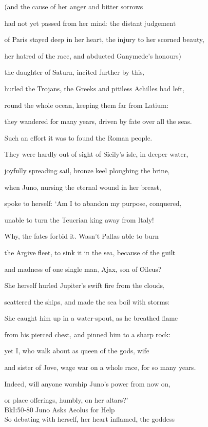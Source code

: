 \documentclass[12pt, a5paper, titlepage]{letter}
\begin{document}
(and the cause of her anger and bitter sorrows

had not yet passed from her mind: the distant judgement

of Paris stayed deep in her heart, the injury to her scorned beauty,

her hatred of the race, and abducted Ganymede’s honours)

the daughter of Saturn, incited further by this,

hurled the Trojans, the Greeks and pitiless Achilles had left,

round the whole ocean, keeping them far from Latium:

they wandered for many years, driven by fate over all the seas.

Such an effort it was to found the Roman people.

They were hardly out of sight of Sicily’s isle, in deeper water,

joyfully spreading sail, bronze keel ploughing the brine,

when Juno, nursing the eternal wound in her breast,

spoke to herself: ‘Am I to abandon my purpose, conquered,

unable to turn the Teucrian king away from Italy!

Why, the fates forbid it. Wasn’t Pallas able to burn

the Argive fleet, to sink it in the sea, because of the guilt

and madness of one single man, Ajax, son of Oileus?

She herself hurled Jupiter’s swift fire from the clouds,

scattered the ships, and made the sea boil with storms:

She caught him up in a water-spout, as he breathed flame

from his pierced chest, and pinned him to a sharp rock:

yet I, who walk about as queen of the gods, wife

and sister of Jove, wage war on a whole race, for so many years.

Indeed, will anyone worship Juno’s power from now on,

or place offerings, humbly, on her altars?’ \\

BkI:50-80 Juno Asks Aeolus for Help \\

So debating with herself, her heart inflamed, the goddess
\end{document}
